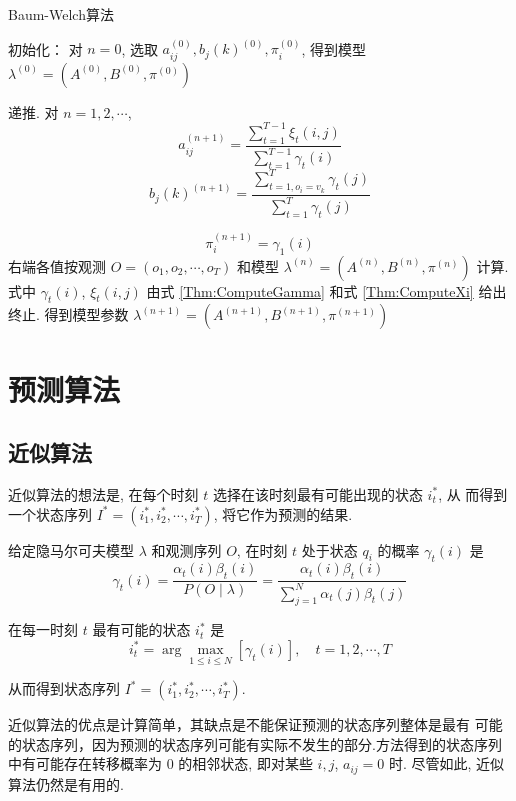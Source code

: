 \begin{algorithm}[htbp]
    \caption{Baum-Welch算法}


    初始化：
对 $ n=0 $, 选取 $ a_{i j}^{(0)}, b_{j}(k)^{(0)}, \pi_{i}^{(0)} $, 得到模型 $ \lambda^{(0)}=\left(A^{(0)}, B^{(0)}, \pi^{(0)}\right) $\;

递推. 对 $ n=1,2, \cdots $,
$$
a_{i j}^{(n+1)}=\frac{\sum_{t=1}^{T-1} \xi_{t}(i, j)}{\sum_{t=1}^{T-1} \gamma_{t}(i)}
$$
$$ b_{j}(k)^{(n+1)}=\frac{\sum_{t=1, o_{i}=v_{k}}^{T} \gamma_{t}(j)}{\sum_{t=1}^{T} \gamma_{t}(j)} $$

$$ \pi_{i}^{(n+1)}=\gamma_{1}(i) $$
右端各值按观测 $ O=\left(o_{1}, o_{2}, \cdots, o_{T}\right) $ 和模型 $ \lambda^{(n)}=\left(A^{(n)}, B^{(n)}, \pi^{(n)}\right) $ 计算. 式中 $ \gamma_{t}(i) $, $ \xi_{t}(i, j) $ 由式 \ref{Thm:ComputeGamma} 和式 \ref{Thm:ComputeXi}  给出\;
终止. 得到模型参数 $ \lambda^{(n+1)}=\left(A^{(n+1)}, B^{(n+1)}, \pi^{(n+1)}\right) $
\end{algorithm}

\section{预测算法}

\subsection{近似算法}

近似算法的想法是, 在每个时刻 $ t $ 选择在该时刻最有可能出现的状态 $ i_{t}^{*} $, 从 而得到一个状态序列 $ I^{*}=\left(i_{1}^{*}, i_{2}^{*}, \cdots, i_{T}^{*}\right) $, 将它作为预测的结果.

给定隐马尔可夫模型 $ \lambda $ 和观测序列 $ O $, 在时刻 $ t $ 处于状态 $ q_{i} $ 的概率 $ \gamma_{t}(i) $ 是
$$
\gamma_{t}(i)=\frac{\alpha_{t}(i) \beta_{t}(i)}{P(O \mid \lambda)}=\frac{\alpha_{t}(i) \beta_{t}(i)}{\sum_{j=1}^{N} \alpha_{t}(j) \beta_{t}(j)}
$$

在每一时刻 $ t $ 最有可能的状态 $ i_{t}^{*} $ 是
$$
i_{t}^{*}=\arg \max _{1 \leqslant i \leqslant N}\left[\gamma_{t}(i)\right], \quad t=1,2, \cdots, T
$$

从而得到状态序列 $ I^{*}=\left(i_{1}^{*}, i_{2}^{*}, \cdots, i_{T}^{*}\right) $.

\begin{remark}
   近似算法的优点是计算简单，其缺点是不能保证预测的状态序列整体是最有
可能的状态序列，因为预测的状态序列可能有实际不发生的部分.方法得到的状态序列中有可能存在转移概率为 0 的相邻状态, 即对某些 $ i, j $, $ a_{i j}=0 $ 时. 尽管如此, 近似算法仍然是有用的. 
\end{remark}

